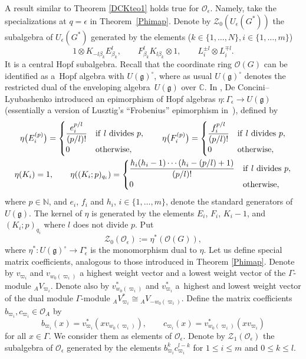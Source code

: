 \documentclass[10pt,a4paper]{amsart}
\numberwithin{equation}{section}
\theoremstyle{definition}
\newcommand{\e}{\epsilon}
\newcommand{\mc}{\mathbb{C}}
\newcommand{\mn}{\mathbb{N}}
\newcommand{\Oo}{{\mathcal O}}
\newcommand{\ra}{\rightarrow}
\begin{document}
A result similar to Theorem \ref{DCKteo1} holds true for $\Oo_\e$. Namely, take the specializations at $q=\e$ in Theorem~\ref{Phimap}. Denote by $\mathcal{Z}_0(U_\e(G^*))$ the subalgebra of $U_\e(G^*)$ generated by the elements ($k\in \{1,\dots, N\}, i\in \{1,\dots, m\}$)
\[1\otimes K_{-l \beta_k}E_{\beta_k}^l ,\qquad F_{\beta_k}^l K_{l\beta_k}\otimes 1,\qquad L_i^{\pm l}\otimes L_i^{\mp l}.\]
It is a central Hopf subalgebra. Recall that the coordinate ring $\Oo(G)$ can be identified as a~Hopf algebra with $U(\mathfrak{g})^\circ$, where as usual $U(\mathfrak{g})^\circ$ denotes the restricted dual of the enveloping algebra~$U(\mathfrak{g})$ over $\mc$. In \cite[Section 6]{DC-L}, De Concini--Lyubashenko introduced an epimorphism of Hopf algebras $\eta\colon\Gamma_\e\ra U(\mathfrak{g})$ (essentially a version of Lusztig's ``Frobenius'' epimorphism in~\cite{Lusztig2}), defined by
\begin{gather}
 \eta\big(E_i^{(p)}\big) = \begin{cases} \dfrac{e_i^{p/l}}{(p/l)!} & {\rm if}\ l \ {\rm divides}\ p,\\ 0 & {\rm otherwise},\end{cases} \qquad \eta\big(F_i^{(p)}\big) = \begin{cases} \dfrac{f_i^{p/l}}{(p/l)!} & {\rm if}\ l \ {\rm divides}\ p,\\ 0 & {\rm otherwise},\end{cases} \nonumber\\
 \eta(K_i)=1 , \qquad \eta((K_i;p)_{q_i}) = \begin{cases} \dfrac{h_i(h_i-1)\cdots (h_i-(p/l)+1)}{(p/l)!} & {\rm if}\ l \ {\rm divides}\ p,\\ 0 & {\rm otherwise},\end{cases}\label{etadef}
\end{gather}
where $p\in \mn$, and $e_i$, $f_i$ and $h_i$, $i\in \{1,\dots,m\}$, denote the standard generators of $U(\mathfrak{g})$. The kernel of $\eta$ is generated by the elements $E_i$, $F_i$, $K_i-1$, and $(K_i;p)_{q_i}$ where $l$ does not divide $p$. Put
\begin{equation}\label{Z0Odef}
\mathcal{Z}_0(\Oo_\e) := \eta^*(\Oo(G)),
\end{equation}
where $\eta^*\colon U(\mathfrak{g})^\circ \ra \Gamma_\e^\circ$ is the monomorphism dual to $\eta$. Let us define special matrix coefficients, analogous to those introduced in Theorem \ref{Phimap}. Denote by $v_{\varpi_i}$ and $v_{w_0(\varpi_i)}$ a highest weight vector and a lowest weight vector of the $\Gamma$-module ${}_AV_{\varpi_i}$. Denote also by $v_{w_0(\varpi_i)}^*$ and $v_{\varpi_i}^*$ a~highest and lowest weight vector of the dual module $\Gamma$-module ${}_AV_{\varpi_i}^* \cong {}_AV_{-w_0(\varpi_i)}$. Define the matrix coefficients $b_{\varpi_i}, c_{\varpi_i}\in \Oo_A$ by
\[b_{\varpi_i}(x) = v_{\varpi_i}^*(xv_{w_0(\varpi_i)}) ,\qquad c_{\varpi_i}(x) = v_{w_0(\varpi_i)}^*(xv_{\varpi_i})\]
for all $x\in \Gamma$. We consider them as elements of $\Oo_\e$. Denote by $\mathcal{Z}_1(\Oo_\e)$ the subalgebra of $\Oo_\e$ generated by the elements $b_{\varpi_i}^kc_{\varpi_i}^{l-k}$ for
$1 \leq i\leq m$ and $0\leq k\leq l$.
\end{document}
